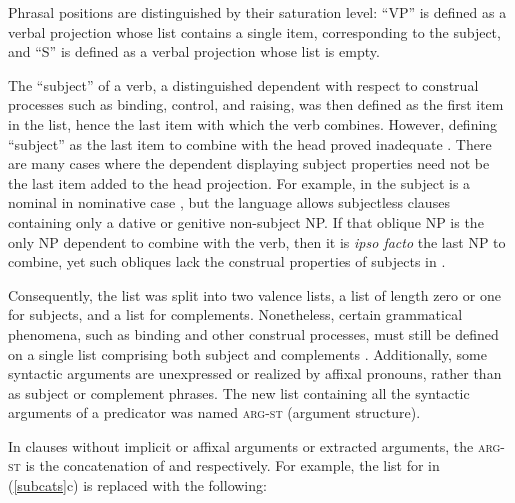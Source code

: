 \documentclass[output=paper,biblatex,babelshorthands,newtxmath,draftmode,colorlinks, citecolor=brown]{langscibook}
\begin{document}
\noindent
Phrasal positions are distinguished by their saturation level: ``VP'' is defined as a verbal
projection whose \subcat list contains a single item, corresponding to the subject, and ``S'' is
defined as a verbal projection whose \subcat list is empty.

The ``subject'' of a verb, a distinguished dependent with respect to
construal processes such as binding, control, and raising, was then defined as the first item in the
\subcat list, hence the last item with which the verb combines.  However, defining ``subject'' as
the last item to combine with the head proved inadequate \citep[Chapter~9]{pollard+sag:1994}.  There
are many cases where the dependent displaying subject properties need not be the last item added to
the head projection.  For example, in  the subject is a nominal in nominative case
\citep{Reis82}, but the language allows subjectless clauses containing only a dative or genitive
non-subject NP.  If that oblique NP is the only NP dependent to combine with
the verb, then it is \emph{ipso facto} the last NP to combine, yet such obliques lack the construal
properties of subjects in .

\largerpage[-1]
Consequently, the \subcat list was split into two valence lists, a \subj list of length zero or one
for subjects, and a \comps list for complements.  Nonetheless, certain grammatical phenomena, such
as binding and other construal processes, must still be defined on a single list comprising both
subject and complements \citep{Manning+Sag:1999}. Additionally, some syntactic arguments are
unexpressed or realized by affixal pronouns, rather than as subject or complement phrases.  The new
list containing all the syntactic arguments of a predicator was named \textsc{arg-st} (argument
structure).

In clauses without implicit or affixal arguments or extracted arguments, the \textsc{arg-st} is the
concatenation of  and  respectively.  For example, the \subcat list for
 in (\ref{subcats}c) is replaced with the following:

\begin{exe} 
	\label{put}
\ex
{}
\end{exe}
\end{document}

